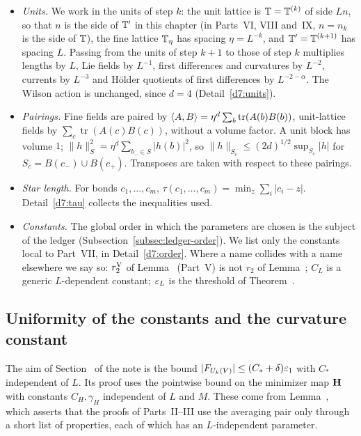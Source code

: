 \begin{itemize}
\item \emph{Units.} We work in the units of step $k$: the unit lattice is $\mathbb T=\mathbb T^{(k)}$ of side $Ln$, so that $n$ is the side of $\mathbb T'$ in this chapter (in Parts~VI, VIII and~IX, $n=n_k$ is the side of $\mathbb T$), the fine lattice $\mathbb T_\eta$ has spacing $\eta=L^{-k}$, and $\mathbb T'=\mathbb T^{(k+1)}$ has spacing $L$. Passing from the units of step $k+1$ to those of step $k$ multiplies lengths by $L$, Lie fields by $L^{-1}$, first differences and curvatures by $L^{-2}$, currents by $L^{-3}$ and H\"older quotients of first differences by $L^{-2-\alpha}$. The Wilson action is unchanged, since $d=4$ (Detail~\ref{d7:units}).
\item \emph{Pairings.} Fine fields are paired by $\langle A,B\rangle=\eta^d\sum_b\operatorname{tr}(A(b)B(b))$, unit-lattice fields by $\sum_c\operatorname{tr}(A(c)B(c))$, without a volume factor. A unit block has volume $1$; $\|h\|_S^2=\eta^d\sum_{b_-\in S}|h(b)|^2$, so $\|h\|_{S_c}\le(2d)^{1/2}\sup_{S_c}|h|$ for $S_c=B(c_-)\cup B(c_+)$. Transposes are taken with respect to these pairings.
\item \emph{Star length.} For bonds $c_1,\dots,c_m$, $\tau(c_1,\dots,c_m)=\min_z\sum_i|c_i-z|$. Detail~\ref{d7:tau} collects the inequalities used.
\item \emph{Constants.} The global order in which the parameters are chosen is the subject of the ledger (Subsection~\ref{subsec:ledger-order}). We list only the constants local to Part~VII, in Detail~\ref{d7:order}. Where a name collides with a name elsewhere we say so: $r_2^{\rm V}$ of Lemma~ (Part~V) is not $r_2$ of Lemma~; $C_L$ is a generic $L$-dependent constant; $\varepsilon_L$ is the threshold of Theorem~.
\end{itemize}

\subsection{Uniformity of the constants and the curvature constant}\label{d7:unif}

The aim of Section~ of the note is the bound $|F_{U_k(V)}|\le(C_*+\delta)\varepsilon_1$ with $C_*$ independent of $L$. Its proof uses the pointwise bound  on the minimizer map $\mathbf H$ with constants $C_H,\gamma_H$ independent of $L$ and $M$. These come from Lemma~, which asserts that the proofs of Parts~II--III use the averaging pair only through a short list of properties, each of which has an $L$-independent parameter.

